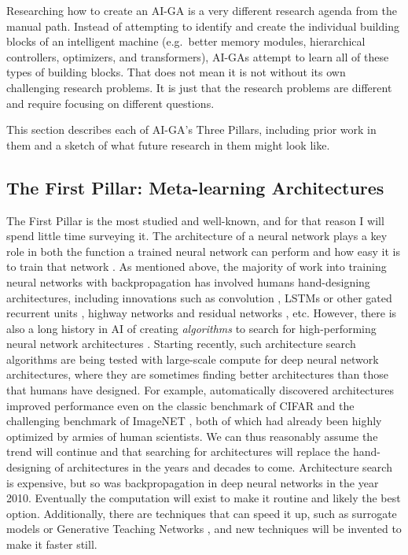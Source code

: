 \documentclass{article}
\begin{document}
Researching how to create an AI-GA is a very different research agenda from the manual path. Instead of attempting to identify and create the individual building blocks of an intelligent machine (e.g.\ better memory modules, hierarchical controllers, optimizers, and transformers), AI-GAs attempt to learn all of these types of building blocks. That does not mean it is not without its own challenging research problems. It is just that the research problems are different and require focusing on different questions. 

This section describes each of AI-GA's Three Pillars, including prior work in them and a sketch of what future research in them might look like. 

\subsection{The First Pillar: Meta-learning Architectures}

The First Pillar is the most studied and well-known, and for that reason I will spend little time surveying it. The architecture of a neural network plays a key role in both the function a trained neural network can perform and how easy it is to train that network \cite{he2015deep,huang:arxiv16,szegedy:arxiv16,Goodfellow-et-al-2016}. As mentioned above, the majority of work into training neural networks with backpropagation has involved humans hand-designing architectures, including innovations such as convolution \cite{lecun1998gradient}, LSTMs or other gated recurrent units \cite{hochreiter:nc97,cho2014properties, chung2014empirical}, highway networks and residual networks \cite{he2015deep,srivastava2015highway}, etc. However, there is also a long history in AI of creating \emph{algorithms} to search for high-performing neural network architectures \cite{lecun1990optimal,stanley2002evolving,gruau1994automatic,yao1999evolving,harp1990designing}. Starting recently, such architecture search algorithms are being tested with large-scale compute for deep neural network architectures, where they are sometimes finding better architectures than those that humans have designed. For example, automatically discovered architectures improved performance even on the classic benchmark of CIFAR and the challenging benchmark of ImageNET \cite{kandasamy2018neural,real:arxiv18,rawal:arxiv18,miikkulainen:arxiv17,zoph2016neural}, both of which had already been highly optimized by armies of human scientists. We can thus reasonably assume the trend will continue and that searching for architectures will replace the hand-designing of architectures in the years and decades to come. Architecture search is expensive, but so was backpropagation in deep neural networks in the year 2010. Eventually the computation will exist to make it routine and likely the best option. Additionally, there are techniques that can speed it up, such as surrogate models \cite{liu2018progressive,klein2016learning,baker2017accelerating,rawal:arxiv18} or Generative Teaching Networks \cite{petroskisuch2019GTN}, and new techniques will be invented to make it faster still. 
\end{document}
